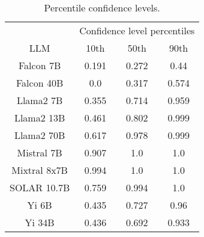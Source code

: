 \begin{table*}
\centering
\begin{tabular}{c|c|c|c}
& \multicolumn{3}{c}{Confidence level percentiles} \\ 
LLM & 10th & 50th & 90th\\ \hline
Falcon 7B & 0.191 & 0.272 & 0.44\\
Falcon 40B & 0.0 & 0.317 & 0.574\\
Llama2 7B & 0.355 & 0.714 & 0.959\\
Llama2 13B & 0.461 & 0.802 & 0.999\\
Llama2 70B & 0.617 & 0.978 & 0.999\\
Mistral 7B & 0.907 & 1.0 & 1.0\\
Mixtral 8x7B & 0.994 & 1.0 & 1.0\\
SOLAR 10.7B & 0.759 & 0.994 & 1.0\\
Yi 6B & 0.435 & 0.727 & 0.96\\
Yi 34B & 0.436 & 0.692 & 0.933\\
\hline
\end{tabular}
\caption{Percentile confidence levels.}
\label{tab:percentile_conf}
\end{table*}
